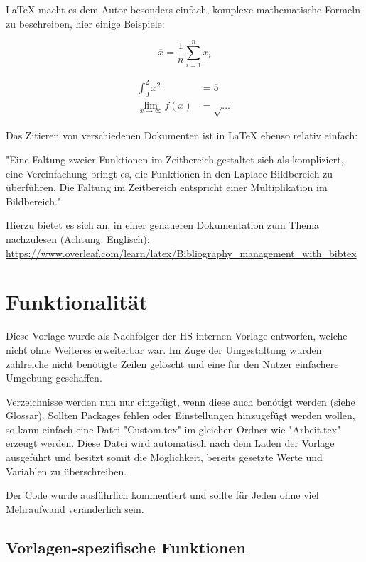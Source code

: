 \LaTeX{} macht es dem Autor besonders einfach, komplexe mathematische Formeln zu beschreiben, hier einige
Beispiele:

\begin{equation}
  \overline{x} = \frac{1}{n} \sum_{i=1}^n x_i
\end{equation}

\begin{align*}
  \int_0^2 x^2 &= 5 \\
  \lim_{x\to\infty} f(x) &= \sqrt{\ldots}
\end{align*}

Das Zitieren von verschiedenen Dokumenten ist in \LaTeX{} ebenso relativ einfach:

"Eine Faltung zweier Funktionen im Zeitbereich gestaltet sich als kompliziert, eine Vereinfachung
bringt es, die Funktionen in den Laplace-Bildbereich zu überführen.
Die Faltung im Zeitbereich entspricht einer Multiplikation im Bildbereich." \cite[S. 339f]{Papula2006}

Hierzu bietet es sich an, in einer genaueren Dokumentation zum Thema nachzulesen (Achtung: Englisch):
\url{https://www.overleaf.com/learn/latex/Bibliography_management_with_bibtex}

\section{Funktionalität}

Diese Vorlage wurde als Nachfolger der HS-internen Vorlage entworfen, welche nicht ohne Weiteres
erweiterbar war. Im Zuge der Umgestaltung wurden zahlreiche nicht benötigte Zeilen
gelöscht und eine für den Nutzer einfachere Umgebung geschaffen.

Verzeichnisse werden nun nur eingefügt, wenn diese auch benötigt werden (siehe \Gls{Glossar}). Sollten Packages fehlen oder
Einstellungen hinzugefügt werden wollen, so kann einfach eine Datei "Custom.tex" im gleichen Ordner wie
"Arbeit.tex" erzeugt werden. Diese Datei wird automatisch nach dem Laden der Vorlage ausgeführt
und besitzt somit die Möglichkeit, bereits gesetzte Werte und Variablen zu überschreiben.

Der Code wurde ausführlich kommentiert und sollte für Jeden ohne viel Mehraufwand veränderlich sein.

\subsection{Vorlagen-spezifische Funktionen}

